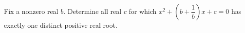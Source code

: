 Fix a nonzero real $b$. Determine all real $c$ for which $x^2+(b+\dfrac{1}{b})x+c=0$ has exactly one distinct positive real root.
